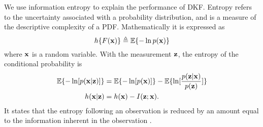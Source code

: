 We use information entropy to explain the performance of DKF. Entropy refers to the uncertainty associated with a probability distribution, and is a measure of the descriptive complexity of a PDF. Mathematically it is expressed as
\begin{equation}
h\{F({\bf x})\}\triangleq\mathbb{E}\{-\ln p({\bf x})\}
\end{equation}
where ${\bf x}$ is a random variable. With the measurement ${\bf z}$, the entropy of the conditional probability is
\begin{equation}
\begin{split}
\mathbb{E}\{-\ln[p({\bf x}|{\bf z})]\}&=\mathbb{E}\{-\ln[p({\bf x})]\}-\mathbb{E}\{\ln[\frac{p({\bf z}|{\bf x})}{p({\bf z})}]\} \\
h({\bf x}|{\bf z})&=h({\bf x})-I({\bf z};{\bf x}).
\end{split}
\end{equation}
It states that the entropy following an observation is reduced by an amount equal to the information inherent in the observation \cite{CRCinbook}.


